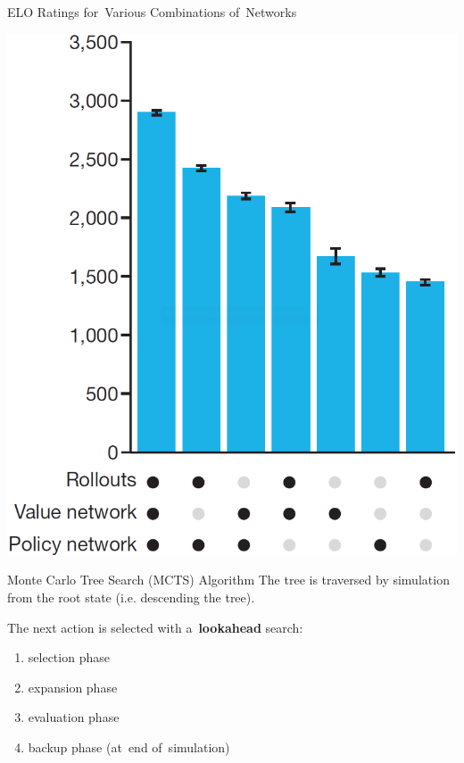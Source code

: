 \documentclass{beamer}
\begin{document}
{    \begin{frame}{ELO Ratings for~Various Combinations of~Networks}
      \begin{center}
        \includegraphics[height=.85\textheight]{../img/ELO_ratings_various_combinations_of_ANNs.png}
      \end{center}
    \end{frame}

    \begin{frame}{Monte Carlo Tree Search (MCTS) Algorithm}
      The tree is traversed by simulation from the root state (i.e. descending the tree).
      \pause

      The next action is selected with a~\textbf{lookahead} search:
      \pause
      \begin{enumerate}[<+- | alert@+>]
        \item selection phase
        \item expansion phase
        \item evaluation phase
        \item backup phase (at~end of~simulation)
          \pause
      \end{enumerate}
    \end{frame}

}
\end{document}
